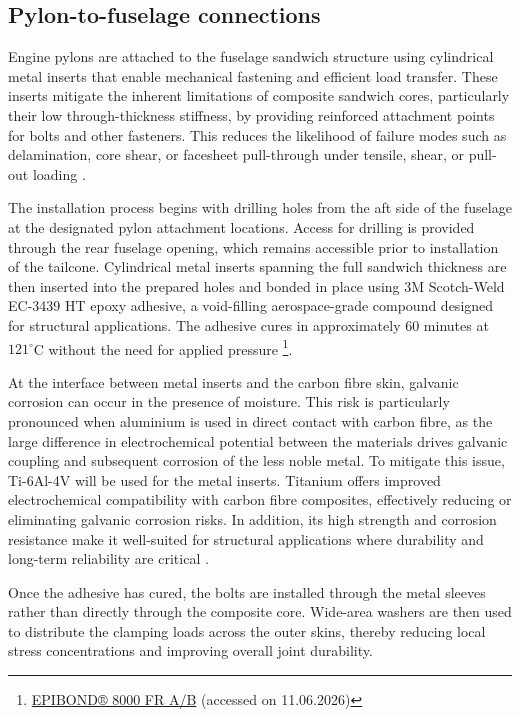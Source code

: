 \subsection{Pylon-to-fuselage connections}
\label{sub:pylon_to_fuselage}

Engine pylons are attached to the fuselage sandwich structure using cylindrical metal inserts that enable mechanical fastening and efficient load transfer. These inserts mitigate the inherent limitations of composite sandwich cores, particularly their low through-thickness stiffness, by providing reinforced attachment points for bolts and other fasteners. This reduces the likelihood of failure modes such as delamination, core shear, or facesheet pull-through under tensile, shear, or pull-out loading \cite{Severson2024}.

The installation process begins with drilling holes from the aft side of the fuselage at the designated pylon attachment locations. Access for drilling is provided through the rear fuselage opening, which remains accessible prior to installation of the tailcone. Cylindrical metal inserts spanning the full sandwich thickness are then inserted into the prepared holes and bonded in place using 3M Scotch-Weld EC-3439 HT epoxy adhesive, a void-filling aerospace-grade compound designed for structural applications. The adhesive cures in approximately 60 minutes at $121^{\circ}$C without the need for applied pressure \footnote{\href{https://products.huntsman.com/products/epibond-8000-fr-a-b-qeuj1kf4}{EPIBOND® 8000 FR A/B} (accessed on 11.06.2026)}.

At the interface between metal inserts and the carbon fibre skin, galvanic corrosion can occur in the presence of moisture. This risk is particularly pronounced when aluminium is used in direct contact with carbon fibre, as the large difference in electrochemical potential between the materials drives galvanic coupling and subsequent corrosion of the less noble metal. To mitigate this issue, Ti-6Al-4V will be used for the metal inserts. Titanium offers improved electrochemical compatibility with carbon fibre composites, effectively reducing or eliminating galvanic corrosion risks. In addition, its high strength and corrosion resistance make it well-suited for structural applications where durability and long-term reliability are critical \cite{Melhem2019}.

Once the adhesive has cured, the bolts are installed through the metal sleeves rather than directly through the composite core. Wide-area washers are then used to distribute the clamping loads across the outer skins, thereby reducing local stress concentrations and improving overall joint durability.

